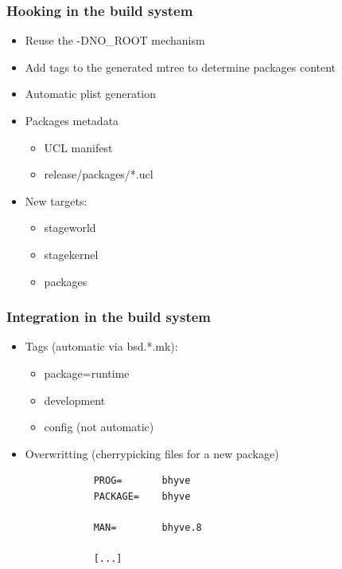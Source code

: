 \begin{frame}
	\frametitle{Hooking in the build system}
	\begin{itemize}
		\item Reuse the -DNO\_ROOT mechanism
		\item Add tags to the generated mtree to determine packages content
		\item Automatic plist generation
		\item Packages metadata
			\begin{itemize}
				\item UCL manifest
				\item release/packages/*.ucl
			\end{itemize}
		\item New targets:
			\begin{itemize}
				\item stageworld
				\item stagekernel
				\item packages
			\end{itemize}
	\end{itemize}
\end{frame}

\begin{frame}[fragile]
	\frametitle{Integration in the build system}
	\begin{itemize}
		\item Tags (automatic via bsd.*.mk):
			\begin{itemize}
				\item package=runtime
				\item development
				\item config (not automatic)
			\end{itemize}
		\item Overwritting (cherrypicking files for a new package)
			\begin{lstlisting}
			PROG=		bhyve
			PACKAGE=	bhyve

			MAN=		bhyve.8

			[...]
			\end{lstlisting}
	\end{itemize}
\end{frame}

